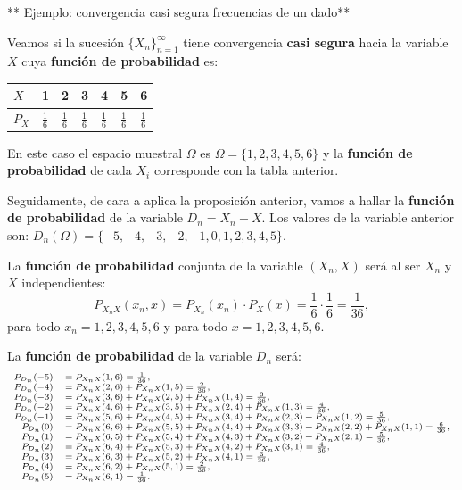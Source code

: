 \documentclass[]{book}
\begin{document}
** Ejemplo: convergencia casi segura frecuencias de un dado**

Veamos si la sucesión \(\{X_n\}_{n=1}^\infty\) tiene convergencia \textbf{casi segura} hacia la variable \(X\) cuya \textbf{función de probabilidad} es:

\begin{longtable}[]{@{}lllllll@{}}
\toprule
\(X\) & 1 & 2 & 3 & 4 & 5 & 6\tabularnewline
\midrule
\endhead
\(P_X\) & \(\frac{1}{6}\) & \(\frac{1}{6}\) & \(\frac{1}{6}\) & \(\frac{1}{6}\) & \(\frac{1}{6}\) & \(\frac{1}{6}\)\tabularnewline
\bottomrule
\end{longtable}

En este caso el espacio muestral \(\Omega\) es \(\Omega=\{1,2,3,4,5,6\}\) y la \textbf{función de probabilidad} de cada \(X_i\) corresponde con la tabla anterior.

Seguidamente, de cara a aplica la proposición anterior, vamos a hallar la \textbf{función de probabilidad} de la variable \(D_n=X_n-X\).
Los valores de la variable anterior son: \(D_n(\Omega)=\{-5,-4,-3,-2,-1,0,1,2,3,4,5\}\).

La \textbf{función de probabilidad} conjunta de la variable \((X_n,X)\) será al ser \(X_n\) y \(X\) independientes:
\[
P_{X_nX}(x_n,x)=P_{X_n}(x_n)\cdot P_X(x)=\frac{1}{6}\cdot \frac{1}{6}=\frac{1}{36},
\]
para todo \(x_n=1,2,3,4,5,6\) y para todo \(x=1,2,3,4,5,6\).

La \textbf{función de probabilidad} de la variable \(D_n\) será:
\[
\scriptsize{
\begin{array}{rl}
P_{D_n}(-5) & =P_{X_nX}(1,6)=\frac{1}{36}, \\
P_{D_n}(-4) & =P_{X_nX}(2,6)+P_{X_nX}(1,5)=\frac{2}{36}, \\
P_{D_n}(-3) & =P_{X_nX}(3,6)+P_{X_nX}(2,5)+P_{X_nX}(1,4)=\frac{3}{36}, \\
P_{D_n}(-2) & =P_{X_nX}(4,6)+P_{X_nX}(3,5)+P_{X_nX}(2,4)+P_{X_nX}(1,3)=\frac{4}{36}, \\
P_{D_n}(-1) & =P_{X_nX}(5,6)+P_{X_nX}(4,5)+P_{X_nX}(3,4)+P_{X_nX}(2,3)+P_{X_nX}(1,2)=\frac{5}{36}, \\
P_{D_n}(0) & =P_{X_nX}(6,6)+P_{X_nX}(5,5)+P_{X_nX}(4,4)+P_{X_nX}(3,3)+P_{X_nX}(2,2)+P_{X_nX}(1,1)=\frac{6}{36}, \\
P_{D_n}(1) & =P_{X_nX}(6,5)+P_{X_nX}(5,4)+P_{X_nX}(4,3)+P_{X_nX}(3,2)+P_{X_nX}(2,1)=\frac{5}{36}, \\
P_{D_n}(2) & =P_{X_nX}(6,4)+P_{X_nX}(5,3)+P_{X_nX}(4,2)+P_{X_nX}(3,1)=\frac{4}{36}, \\
P_{D_n}(3) & =P_{X_nX}(6,3)+P_{X_nX}(5,2)+P_{X_nX}(4,1)=\frac{3}{36}, \\
P_{D_n}(4) & =P_{X_nX}(6,2)+P_{X_nX}(5,1)=\frac{2}{36}, \\
P_{D_n}(5) & =P_{X_nX}(6,1)=\frac{1}{36}.
\end{array}
}
\]
\end{document}
